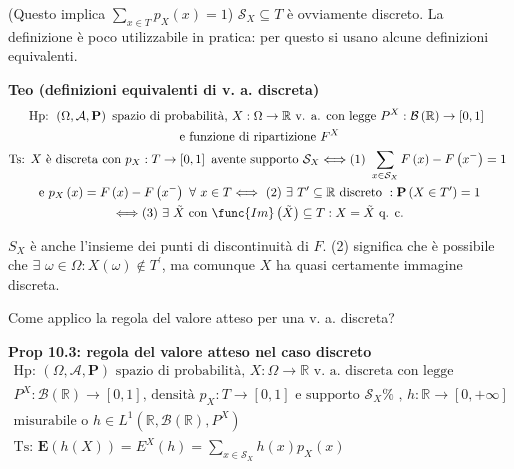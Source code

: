 \documentclass{article}
\begin{document}
(Questo implica $\sum_{x\in T}p_{X}\left( x\right) =1$) $\mathcal{S}%
_{X}\subseteq T$ \`{e} ovviamente discreto. La definizione 
\`{e} poco utilizzabile in pratica: per questo si usano alcune definizioni
equivalenti.

\textbf{Teo (definizioni equivalenti di v. a. discreta)}%
\begin{gather*}
\text{Hp: }\left( \Omega ,\mathcal{A},\mathbf{P}\right) \text{ spazio di
probabilit\`{a}, }X:\Omega \rightarrow 
\mathbb{R}
\text{ v. a. con legge }P^{X}:\mathcal{B}\left( 
\mathbb{R}
\right) \rightarrow \left[ 0,1\right] \text{ } \\
\text{e funzione di ripartizione }F^{X} \\
\text{Ts: }X\text{ \`{e} discreta con }p_{X}:T\rightarrow \left[ 0,1\right] 
\text{ avente supporto }\mathcal{S}_{X}\Longleftrightarrow \text{(1) }%
\sum_{x\in \mathcal{S}_{X}}F\left( x\right) -F\left( x^{-}\right) =1\text{ }
\\
\text{e }p_{X}\left( x\right) =F\left( x\right) -F\left( x^{-}\right) \text{ 
}\forall \text{ }x\in T\Longleftrightarrow \text{ (2) }\exists \text{ }%
T^{\prime }\subseteq 
\mathbb{R}
\text{ discreto }:\mathbf{P}\left( X\in T^{\prime }\right) =1 \\
\Longleftrightarrow \text{(3) }\exists \text{ }\tilde{X}\text{ con }\func{Im}%
\left( \tilde{X}\right) \subseteq T:X=\tilde{X}\text{ q. c.}
\end{gather*}

$S_{X}$ \`{e} anche l'insieme dei punti di discontinuit\`{a} di $F$. (2)
significa che \`{e} possibile che $\exists $ $\omega \in \Omega :X\left(
\omega \right) \not\in T^{\prime }$, ma comunque $X$ ha quasi certamente
immagine discreta.

Come applico la regola del valore atteso per una v. a. discreta?

\textbf{Prop 10.3: regola del valore atteso nel caso discreto}%
\begin{gather*}
\text{Hp: }\left( \Omega ,\mathcal{A},\mathbf{P}\right) \text{ spazio di
probabilit\`{a}, }X:\Omega \rightarrow 
\mathbb{R}
\text{ v. a. discreta con legge } \\
P^{X}:\mathcal{B}\left( 
\mathbb{R}
\right) \rightarrow \left[ 0,1\right] \text{, densit\`{a} }%
p_{X}:T\rightarrow \left[ 0,1\right] \text{ e supporto }\mathcal{S}_{X}\text{%
, }h:%
\mathbb{R}
\rightarrow \left[ 0,+\infty \right] \text{ } \\
\text{misurabile o }h\in L^{1}\left( 
\mathbb{R}
,\mathcal{B}\left( 
\mathbb{R}
\right) ,P^{X}\right) \\
\text{Ts: }\mathbf{E}\left( h\left( X\right) \right) =E^{X}\left( h\right)
=\sum_{x\in \mathcal{S}_{X}}h\left( x\right) p_{X}\left( x\right)
\end{gather*}
\end{document}
